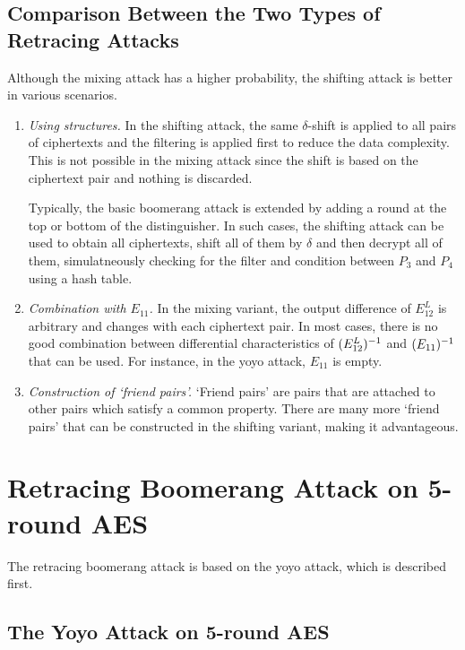 \documentclass[twoside]{article}
\begin{document}
\subsection{Comparison Between the Two Types of Retracing Attacks}

Although the mixing attack has a higher probability, the shifting attack is
better in various scenarios.

\begin{enumerate}
    \item \emph{Using structures.} In the shifting attack, the same
    \(\delta\)-shift is applied to all pairs of ciphertexts and the filtering is
    applied first to reduce the data complexity. This is not possible in the
    mixing attack since the shift is based on the ciphertext pair and nothing is
    discarded. 
    
    Typically, the basic boomerang attack is extended by adding a round at the
    top or bottom of the distinguisher. In such cases, the shifting attack can
    be used to obtain all ciphertexts, shift all of them by \(\delta\) and then
    decrypt all of them, simulatneously checking for the filter and condition
    between \(P_3\) and \(P_4\) using a hash table.
    
    \item \emph{Combination with \(E_{11}\).} In the mixing variant, the output
    difference of \(E_{12}^L\) is arbitrary and changes with each ciphertext
    pair. In most cases, there is no good combination between differential
    characteristics of \((E_{12}^L)^{-1}\) and \((E_{11})^{-1}\) that
    can be used. For instance, in the yoyo attack, \(E_{11}\) is empty.

    \item \emph{Construction of `friend pairs'.} `Friend pairs' are pairs that
    are attached to other pairs which satisfy a common property. There are many
    more `friend pairs' that can be constructed in the shifting variant, making
    it advantageous.
\end{enumerate}

\section{Retracing Boomerang Attack on 5-round AES}

The retracing boomerang attack is based on the yoyo attack, which is described
first.

\subsection{The Yoyo Attack on 5-round AES}
\end{document}
